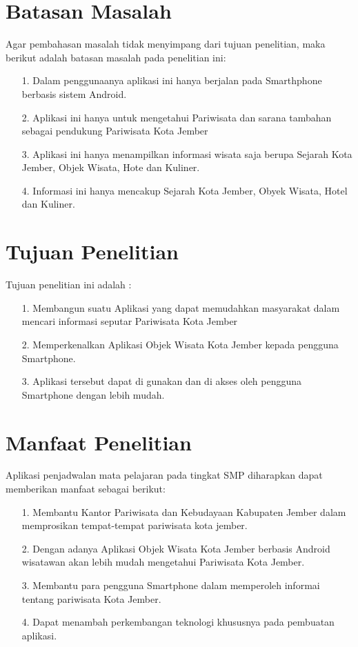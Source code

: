 \documentclass{jtetiproposalskripsi}
\begin{document}
\section{Batasan Masalah}
Agar pembahasan masalah tidak menyimpang dari tujuan penelitian, maka berikut adalah batasan masalah pada  penelitian ini:
\begin{itemize}
\item[1.]Dalam penggunaanya aplikasi ini hanya berjalan pada Smarthphone berbasis sistem Android.
\item[2.]Aplikasi ini hanya untuk mengetahui Pariwisata dan  sarana tambahan sebagai pendukung Pariwisata Kota Jember
\item[3.]Aplikasi ini hanya menampilkan informasi wisata saja berupa Sejarah Kota Jember, Objek Wisata, Hote dan Kuliner.
\item[4.]Informasi ini hanya mencakup Sejarah Kota Jember, Obyek Wisata, Hotel dan Kuliner.
\end{itemize}

\section{Tujuan Penelitian}
Tujuan penelitian ini adalah :
\begin{itemize}
\item[1.]Membangun suatu Aplikasi yang dapat memudahkan masyarakat dalam mencari informasi seputar Pariwisata Kota Jember
\item[2.]Memperkenalkan Aplikasi Objek Wisata Kota Jember kepada pengguna Smartphone.
\item[3.]Aplikasi tersebut dapat di gunakan dan di akses oleh pengguna Smartphone dengan lebih mudah.
\end{itemize}

\section{Manfaat Penelitian}
Aplikasi penjadwalan mata pelajaran pada tingkat SMP diharapkan dapat memberikan manfaat sebagai berikut:
\begin{itemize}
\item[1.]Membantu Kantor Pariwisata dan Kebudayaan Kabupaten Jember dalam memprosikan tempat-tempat pariwisata kota jember.
\item[2.]Dengan adanya Aplikasi Objek Wisata Kota Jember berbasis Android wisatawan akan lebih mudah mengetahui Pariwisata Kota Jember.
\item[3.]Membantu para pengguna Smartphone dalam memperoleh informai tentang pariwisata Kota Jember.
\item[4.]Dapat menambah perkembangan teknologi khususnya pada pembuatan aplikasi.
\end{itemize}
\end{document}
